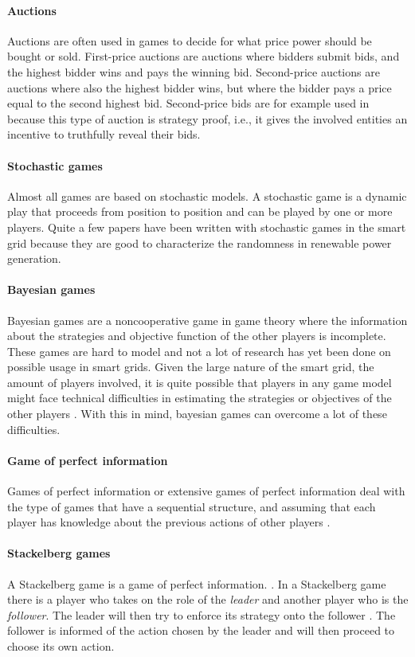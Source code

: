 \paragraph{Auctions}
Auctions are often used in games to decide for what price power should be bought or sold. First-price auctions are auctions where bidders submit bids, and the highest bidder wins and pays the winning bid. Second-price auctions are auctions where also the highest bidder wins, but where the bidder pays a price equal to the second highest bid. Second-price bids are for example used in \cite{SaadHanPoorEtAl2011} because this type of auction is strategy proof, i.e., it gives the involved entities an incentive to truthfully reveal their bids.
\paragraph{Stochastic games}
Almost all games are based on stochastic models. A stochastic game is a dynamic play that proceeds from position to position \cite{Shapley1953} and can be played by one or more players. Quite a few papers have been written with stochastic games in the smart grid \cite{LiangZhuang2014} because they are good to characterize the randomness in renewable power generation.  
\paragraph{Bayesian games}
Bayesian games are a noncooperative game in game theory where the information about the strategies and objective function of the other players is incomplete. These games are hard to model and not a lot of research has yet been done on possible usage in smart grids. Given the large nature of the smart grid, the amount of players involved, it is quite possible that players in any game model might face technical difficulties in estimating the strategies or objectives of the other players \cite{keypaper}. With this in mind, bayesian games can overcome a lot of these difficulties. 

\paragraph{Game of perfect information}
Games of perfect information or extensive games of perfect information deal with the type of games that have a sequential structure, and assuming that each player has knowledge about the previous actions of other players \cite{CourseInGameTheory}.

\paragraph{Stackelberg games}
A Stackelberg game is a game of perfect information. \cite{CourseInGameTheory}.
In a Stackelberg game there is a player who takes on the role of the \textit{leader} and another player who is the \textit{follower}. The leader will then try to enforce its strategy onto the follower \cite{ShohamLeyton-Brown2008}. The follower is informed of the action chosen by the leader and will then proceed to choose its own action. 

